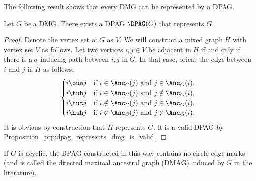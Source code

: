 The following result shows that every DMG can be represented by a DPAG.
\begin{Prp}\label{prp:from_dmg_to_dpag}
  Let $G$ be a DMG. There exists a DPAG $\DPAG(G)$ that represents $G$.
\end{Prp}
\begin{proof}
  Denote the vertex set of $G$ as $V$.
  We will construct a mixed graph $H$ with vertex set $V$ as follows.
  Let two vertices $i,j \in V$ be adjacent in $H$ if and only if there is a $\sigma$-inducing path between $i,j$ in $G$.
  In that case, orient the edge between $i$ and $j$ in $H$ as follows:
    $$\begin{cases}
      \text{$i \ouo j$} & \text{if $i \in \Anc_G(j)$ and $j \in \Anc_G(i)$}, \\
      \text{$i \tuh  j$} & \text{if $i \in \Anc_G(j)$ and $j \notin \Anc_G(i)$}, \\
      \text{$i \hut  j$} & \text{if $i \notin \Anc_G(j)$ and $j \in \Anc_G(i)$}, \\
      \text{$i \huh j$} & \text{if $i \not\in \Anc_G(j)$ and $j \not\in \Anc_G(i)$.}
    \end{cases}$$
  It is obvious by construction that $H$ represents $G$.
  It is a valid DPAG by Proposition~\ref{prp:dpag_represents_dmg_is_valid}.
\end{proof}
If $G$ is acyclic, the DPAG constructed in this way contains no circle edge marks (and is called the directed maximal ancestral graph (DMAG) induced by $G$ in the literature).

